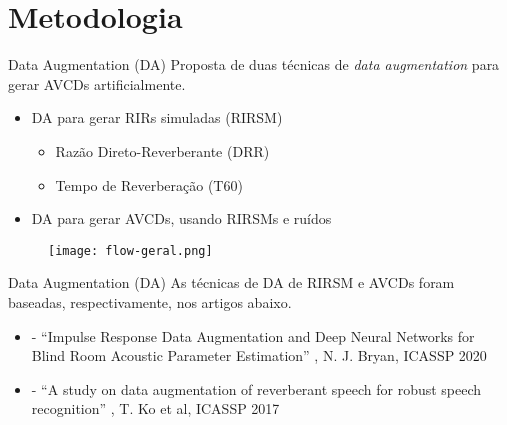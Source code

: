 \section{Metodologia}

\begin{frame}{Data Augmentation (DA)}
    Proposta de duas técnicas de \textit{data augmentation} para gerar AVCDs artificialmente.
    \vspace{0.5cm}

    \begin{itemize}
        \item DA para gerar RIRs simuladas (RIRSM)
        \begin{itemize}
            \item Razão Direto-Reverberante (DRR)
            \item Tempo de Reverberação (T60)
        \end{itemize}
        \item DA para gerar AVCDs, usando RIRSMs e ruídos
    \end{itemize}
    \vspace{0.5cm}

    \begin{figure} 
        \texttt{[image: flow-geral.png]}
        \label{fig:flow-geral}
    \end{figure}
\end{frame}

\begin{frame}{Data Augmentation (DA)}
    As técnicas de DA de RIRSM e AVCDs foram baseadas, respectivamente, nos artigos abaixo.
    \vspace{0.5cm}
    
    \begin{itemize}
        \item \cite{RIR_Data_Aug} - “Impulse Response Data Augmentation and Deep
        Neural Networks for Blind Room Acoustic Parameter Estimation”
        , N. J. Bryan, ICASSP 2020
        \item \cite{Speech_Rec} - “A study on data augmentation of reverberant speech
        for robust speech recognition”
        , T. Ko et al, ICASSP 2017
    \end{itemize}
\end{frame}

